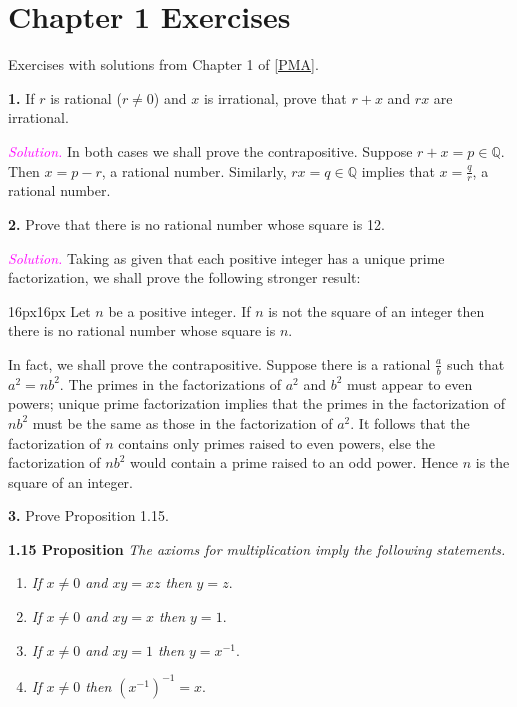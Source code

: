 \documentclass[12pt]{article}
\newcommand{\newp}{\vspace{5mm}}
\theoremstyle{definition}
\begin{document}
\section{Chapter 1 Exercises}

Exercises with solutions from Chapter 1 of \hyperlink{pma}{[PMA]}.

\newp

\textbf{1.} If \( r \) is rational (\( r \neq 0 \)) and \( x \) is irrational, prove that \( r + x \) and \( rx \) are irrational.

\newp

\textit{\textcolor{magenta}{Solution.}} In both cases we shall prove the contrapositive. Suppose \( r + x = p \in \mathbb{Q} \). Then \( x = p - r \), a rational number. Similarly, \( rx = q \in \mathbb{Q} \) implies that \( x = \frac{q}{r} \), a rational number.

\newp

\textbf{2.} Prove that there is no rational number whose square is 12.

\newp

\textit{\textcolor{magenta}{Solution.}} Taking as given that each positive integer has a unique prime factorization, we shall prove the following stronger result:
\vspace{6px}
\begin{adjustwidth}{16px}{16px}
    Let \( n \) be a positive integer. If \( n \) is not the square of an integer then there is no rational number whose square is \( n \).
\end{adjustwidth}
\vspace{6px}
In fact, we shall prove the contrapositive. Suppose there is a rational \( \frac{a}{b} \) such that \( a^2 = n b^2 \). The primes in the factorizations of \( a^2 \) and \( b^2 \) must appear to even powers; unique prime factorization implies that the primes in the factorization of \( nb^2 \) must be the same as those in the factorization of \( a^2 \). It follows that the factorization of \( n \) contains only primes raised to even powers, else the factorization of \( n b^2 \) would contain a prime raised to an odd power. Hence \( n \) is the square of an integer.

\newp

\textbf{3.} Prove Proposition 1.15.

\newp

\textbf{1.15 Proposition} \textit{The axioms for multiplication imply the following statements.}

\begin{enumerate}[label = (\alph*)]
    \item \textit{If \( x \neq 0 \) and \( xy = xz \) then \( y = z \)}.
    \item \textit{If \( x \neq 0 \) and \( xy = x \) then \( y = 1 \)}.
    \item \textit{If \( x \neq 0 \) and \( xy = 1 \) then \( y = x^{-1} \)}.
    \item \textit{If \( x \neq 0 \) then \( \left(x^{-1}\right)^{-1} = x \)}.
\end{enumerate}
\end{document}

